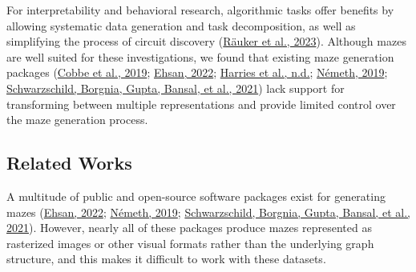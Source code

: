 \documentclass[10pt,a4paper,onecolumn]{article}
\begin{document}
For interpretability and behavioral research, algorithmic tasks offer
benefits by allowing systematic data generation and task decomposition,
as well as simplifying the process of circuit discovery
(\protect\hyperlink{ref-interpretability-survery}{Räuker et al., 2023}).
Although mazes are well suited for these investigations, we found that
existing maze generation packages
(\protect\hyperlink{ref-cobbe2019procgen}{Cobbe et al., 2019};
\protect\hyperlink{ref-gh_Ehsan_2022}{Ehsan, 2022};
\protect\hyperlink{ref-harriesMazeExplorerCustomisable3D2019}{Harries et
al., n.d.}; \protect\hyperlink{ref-gh_Nemeth_2019}{Németh, 2019};
\protect\hyperlink{ref-easy_to_hard}{Schwarzschild, Borgnia, Gupta,
Bansal, et al., 2021}) lack support for transforming between multiple
representations and provide limited control over the maze generation
process.

\hypertarget{related-works}{%
\subsection{Related Works}\label{related-works}}

A multitude of public and open-source software packages exist for
generating mazes (\protect\hyperlink{ref-gh_Ehsan_2022}{Ehsan, 2022};
\protect\hyperlink{ref-gh_Nemeth_2019}{Németh, 2019};
\protect\hyperlink{ref-easy_to_hard}{Schwarzschild, Borgnia, Gupta,
Bansal, et al., 2021}). However, nearly all of these packages produce
mazes represented as rasterized images or other visual formats rather
than the underlying graph structure, and this makes it difficult to work
with these datasets.
\end{document}
